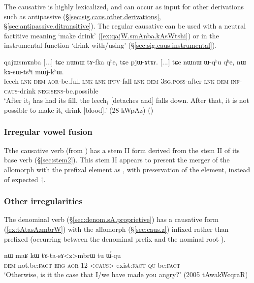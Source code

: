The causative  is highly lexicalized, and can occur as input for other derivations such as antipassive (§\ref{sec:sig.caus.other.derivations}, §\ref{sec:antipassive.ditransitive}). The regular causative   can be used with a neutral factitive meaning `make drink' (\ref{ex:qajW.smAnba.kAsWtshi}) or in the instrumental function `drink with/using' (§\ref{sec:sig.caus.instrumental}).

\begin{exe} 
\ex \label{ex:qajW.smAnba.kAsWtshi}
\gll qajɯsmɤnba [...] tɕe nɯnɯ tɤ-fka qʰe, tɕe pjɯ-ɤtɤr. [...] tɕe nɯnɯ ɯ-qʰu qʰe, nɯ kɤ-sɯ-tsʰi mɯ́j-kʰɯ. \\
leech { } \textsc{lnk} \textsc{dem} \textsc{aor}-be.full \textsc{lnk} \textsc{lnk} \textsc{ipfv}-fall {  }  \textsc{lnk} \textsc{dem} \textsc{3sg}.\textsc{poss}-after \textsc{lnk} \textsc{dem} \textsc{inf}-\textsc{caus}-drink \textsc{neg}:\textsc{sens}-be.possible \\
\glt `After it$_i$ has had its fill, the leech$_i$ [detaches and] falls down. After that, it is not possible to make it$_i$ drink [blood].' (28-kWpAz)
()
\end{exe}
 
 
\subsubsection{Irregular vowel fusion} \label{sec:caus.sAG}
Tthe causative verb  (from ) has a stem II form  derived from the stem II  of its base verb (§\ref{sec:stem2}). This stem II appears to present the merger of the  allomorph with the  prefixal element as , with preservation of the  element, instead of expected $\dagger$.


\subsubsection{Other irregularities} \label{sec:sig.caus.irregular.other}
The denominal verb  (§\ref{sec:denom.sA.proprietive}) has a causative form  (\ref{ex:tAtasAzmbrW}) with the  allomorph (§\ref{sec:caus.z}) infixed rather than prefixed (occurring between the denominal  prefix and the nominal root ).

\begin{exe} 
\ex \label{ex:tAtasAzmbrW}
\gll nɯ maʁ kɯ tɤ-ta-sɤ<z>mbrɯ tu ɯ́-ŋu \\
 \textsc{dem} not.be:\textsc{fact} \textsc{erg} \textsc{aor}-1\fl{}2-<\textsc{caus}> exist:\textsc{fact} \textsc{qu}-be:\textsc{fact} \\
 \glt `Otherwise, is it the case that I/we have made you angry?' (2005 tAwakWcqraR)
 \end{exe}
 

